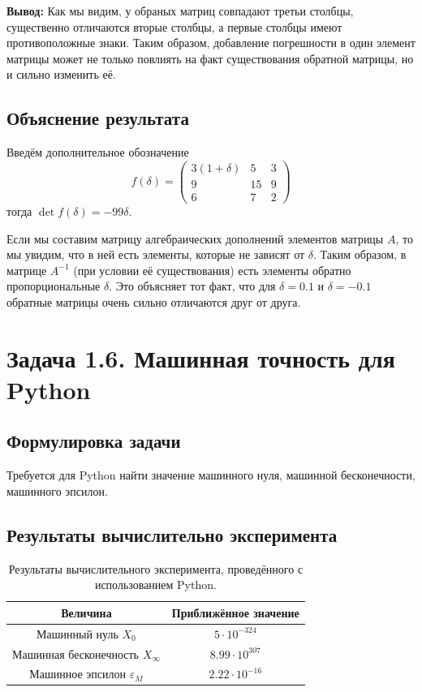 \documentclass[12pt]{article}%
\begin{document}
\textbf{Вывод:} Как мы видим, у обраных матриц совпадают третьи столбцы, существенно отличаются вторые столбцы, а первые столбцы имеют противоположные знаки. Таким образом, добавление погрешности в один элемент матрицы может не только повлиять на факт существования обратной матрицы, но и сильно изменить её.

\subsection{Объяснение результата}
Введём дополнительное обозначение
\[
f(\delta) = \begin{pmatrix}
    3 (1 + \delta) & 5 & 3 \\
    9              & 15 & 9 \\
    6              & 7  & 2
\end{pmatrix}
\]
тогда $\det f(\delta) = -99 \delta$. 

Если мы составим матрицу алгебраических дополнений элементов матрицы $A$, то мы увидим, что в ней есть элементы, которые не зависят от $\delta$. Таким образом, в матрице $A^{-1}$ (при условии её существования) есть элементы обратно пропорциональные $\delta$. Это объясняет тот факт, что для $\delta = 0.1$ и $\delta = -0.1$ обратные матрицы очень сильно отличаются друг от друга.

\newpage
\section{Задача 1.6. Машинная точность для Python}
\subsection{Формулировка задачи}
Требуется для Python найти значение машинного нуля, машинной бесконечности, машинного эпсилон.

\subsection{Результаты вычислительно эксперимента}
\begin{table}[!h]
    \centering
    \begin{tabular}{|c|c|}
         \hline Величина & Приближённое значение \\
         \hline Машинный нуль $X_0$ & $5 \cdot 10^{-324}$ \\
         \hline Машинная бесконечность $X_{\infty}$ & $8.99 \cdot 10^{307}$ \\
         \hline Машинное эпсилон $\varepsilon_M$ & $2.22 \cdot 10^{-16}$ \\
         \hline
    \end{tabular}
    \caption{Результаты вычислительного эксперимента, проведённого с использованием Python.}
    \label{tab:my_label}
\end{table}
\end{document}
